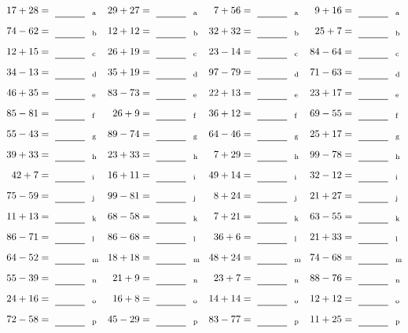 \documentclass
[
  draft    = true,
  fontsize = 11pt,
  parskip  = half-
]
{scrartcl}
\begin{document}
\clearpage
\begin{align*}
    \pline{17+28}&=\rline{a}
  & \pline{29+27}&=\rline{a}
  & \pline{7+56}&=\rline{a}
  & \pline{9+16}&=\rline{a} \\[1ex]
    \pline{74-62}&=\rline{b}
  & \pline{12+12}&=\rline{b}
  & \pline{32+32}&=\rline{b}
  & \pline{25+7}&=\rline{b} \\[1ex]
    \pline{12+15}&=\rline{c}
  & \pline{26+19}&=\rline{c}
  & \pline{23-14}&=\rline{c}
  & \pline{84-64}&=\rline{c} \\[1ex]
    \pline{34-13}&=\rline{d}
  & \pline{35+19}&=\rline{d}
  & \pline{97-79}&=\rline{d}
  & \pline{71-63}&=\rline{d} \\[1ex]
    \pline{46+35}&=\rline{e}
  & \pline{83-73}&=\rline{e}
  & \pline{22+13}&=\rline{e}
  & \pline{23+17}&=\rline{e} \\[1ex]
    \pline{85-81}&=\rline{f}
  & \pline{26+9}&=\rline{f}
  & \pline{36+12}&=\rline{f}
  & \pline{69-55}&=\rline{f} \\[1ex]
    \pline{55-43}&=\rline{g}
  & \pline{89-74}&=\rline{g}
  & \pline{64-46}&=\rline{g}
  & \pline{25+17}&=\rline{g} \\[1ex]
    \pline{39+33}&=\rline{h}
  & \pline{23+33}&=\rline{h}
  & \pline{7+29}&=\rline{h}
  & \pline{99-78}&=\rline{h} \\[1ex]
    \pline{42+7}&=\rline{i}
  & \pline{16+11}&=\rline{i}
  & \pline{49+14}&=\rline{i}
  & \pline{32-12}&=\rline{i} \\[1ex]
    \pline{75-59}&=\rline{j}
  & \pline{99-81}&=\rline{j}
  & \pline{8+24}&=\rline{j}
  & \pline{21+27}&=\rline{j} \\[1ex]
    \pline{11+13}&=\rline{k}
  & \pline{68-58}&=\rline{k}
  & \pline{7+21}&=\rline{k}
  & \pline{63-55}&=\rline{k} \\[1ex]
    \pline{86-71}&=\rline{l}
  & \pline{86-68}&=\rline{l}
  & \pline{36+6}&=\rline{l}
  & \pline{21+33}&=\rline{l} \\[1ex]
    \pline{64-52}&=\rline{m}
  & \pline{18+18}&=\rline{m}
  & \pline{48+24}&=\rline{m}
  & \pline{74-68}&=\rline{m} \\[1ex]
    \pline{55-39}&=\rline{n}
  & \pline{21+9}&=\rline{n}
  & \pline{23+7}&=\rline{n}
  & \pline{88-76}&=\rline{n} \\[1ex]
    \pline{24+16}&=\rline{o}
  & \pline{16+8}&=\rline{o}
  & \pline{14+14}&=\rline{o}
  & \pline{12+12}&=\rline{o} \\[1ex]
    \pline{72-58}&=\rline{p}
  & \pline{45-29}&=\rline{p}
  & \pline{83-77}&=\rline{p}
  & \pline{11+25}&=\rline{p}
\end{align*}
\end{document}
